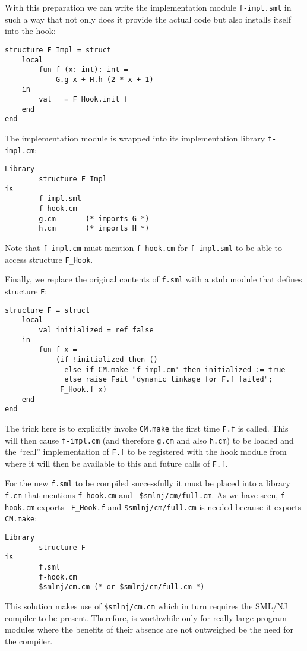 \documentclass[titlepage,letterpaper]{article}
\begin{document}
With this preparation we can write the implementation module {\tt f-impl.sml}
in such a way that not only does it provide the actual
code but also installs itself into the hook:
\begin{verbatim}
structure F_Impl = struct
    local
        fun f (x: int): int =
            G.g x + H.h (2 * x + 1)
    in
        val _ = F_Hook.init f
    end
end
\end{verbatim}
\noindent The implementation module is wrapped into its implementation
library {\tt f-impl.cm}:
\begin{verbatim}
Library
        structure F_Impl
is
        f-impl.sml
        f-hook.cm
        g.cm       (* imports G *)
        h.cm       (* imports H *)
\end{verbatim}
\noindent Note that {\tt f-impl.cm} must mention {\tt f-hook.cm} for
{\tt f-impl.sml} to be able to access structure {\tt F\_Hook}.

Finally, we replace the original contents of {\tt f.sml} with a stub
module that defines structure {\tt F}:
\begin{verbatim}
structure F = struct
    local
        val initialized = ref false
    in
        fun f x =
            (if !initialized then ()
              else if CM.make "f-impl.cm" then initialized := true
              else raise Fail "dynamic linkage for F.f failed";
             F_Hook.f x)
    end
end
\end{verbatim}
\noindent The trick here is to explicitly invoke {\tt CM.make} the
first time {\tt F.f} is called.  This will then cause {\tt f-impl.cm}
(and therefore {\tt g.cm} and also {\tt h.cm}) to be loaded and the
``real'' implementation of {\tt F.f} to be registered with the hook
module from where it will then be available to this and future calls
of {\tt F.f}.

For the new {\tt f.sml} to be compiled successfully it must be placed
into a library {\tt f.cm} that mentions {\tt f-hook.cm} and {\tt
\$smlnj/cm/full.cm}.  As we have seen, {\tt f-hook.cm} exports {\tt
F\_Hook.f} and {\tt \$smlnj/cm/full.cm} is needed because it exports
{\tt CM.make}:

\begin{verbatim}
Library
        structure F
is
        f.sml
        f-hook.cm
        $smlnj/cm.cm (* or $smlnj/cm/full.cm *)
\end{verbatim}

  This solution makes use of {\tt \$smlnj/cm.cm}
which in turn requires the SML/NJ compiler to be present.  Therefore,
is worthwhile only for really large program modules where the benefits
of their absence are not outweighed be the need for the compiler.
\end{document}

